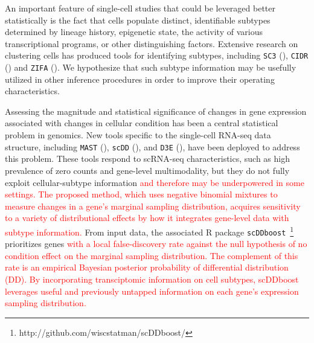 \documentclass[aoas,preprint]{imsart}
\begin{document}
An important feature of single-cell studies that could be leveraged better
statistically is the fact that cells populate distinct, identifiable subtypes
determined by lineage history, epigenetic state, the activity
of various transcriptional programs, or other 
distinguishing factors. Extensive research on clustering cells
has produced tools for identifying subtypes, including 
 \verb+SC3+ (\cite{sc3}), \verb+CIDR+ (\cite{CIDR}) and \verb+ZIFA+ (\cite{ZIFA}).
We hypothesize that such
subtype information may be usefully utilized in other inference procedures in order
to improve their operating characteristics. 

Assessing the magnitude and statistical significance of changes in gene
expression associated with changes in cellular condition has been a central
statistical problem in genomics. New tools specific to
the single-cell RNA-seq data structure, including \verb+MAST+
(\cite{ref:MAST}), \verb+scDD+ (\cite{ref:scDD}), and \verb+D3E+ (\cite{ref:d3e}),
have been deployed to address this problem.
These tools respond
to scRNA-seq characteristics, such as high prevalence of zero counts and
gene-level multimodality, but they do not fully exploit cellular-subtype
information \textcolor{red}{and therefore may be underpowered in some settings.  The proposed method,
which uses negative binomial mixtures to measure changes in a gene's marginal sampling distribution, 
acquires sensitivity to a variety of distributional effects by how it integrates 
gene-level data with subtype information.}
From input data, the associated R package 
\verb+scDDboost+~\footnote{http://github.com/wiscstatman/scDDboost/}
prioritizes genes \textcolor{red}{with a local false-discovery rate against the 
null hypothesis of no condition effect on the marginal sampling distribution.  The complement
of this rate is an empirical Bayesian posterior probability of differential distribution (DD). 
By incorporating transciptomic information on cell subtypes, scDDboost leverages
useful and previously untapped information on each gene's expression sampling distribution.}

\end{document}
